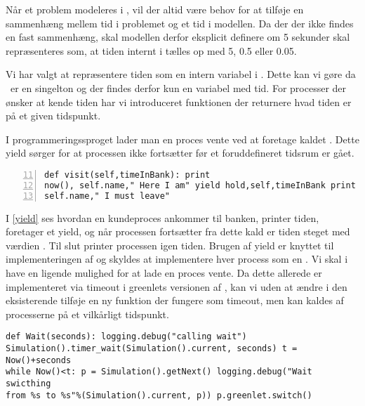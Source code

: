 Når et problem modeleres i \des, vil der altid være behov for at
tilføje en sammenhæng mellem tid i problemet og et tid i modellen. Da
der der ikke findes en fast sammenhæng, skal modellen derfor eksplicit
definere om 5 sekunder skal repræsenteres som, at tiden internt i
\pycsp tælles op med 5, 0.5 eller 0.05.

Vi har valgt at repræsentere tiden som en intern variabel i \sched.
Dette kan vi gøre da \sched ~er en singelton og der findes derfor kun
en variabel med tid. For processer der ønsker at kende tiden har vi
introduceret funktionen  der returnere hvad tiden er på et
given tidspunkt.




I programmeringssproget \simpy lader man en proces vente ved at
foretage kaldet . Dette yield sørger for at processen ikke
fortsætter før et foruddefineret tidsrum er gået.

\begin{lstlisting}[firstnumber=11 , stepnumber=2, numbers=left,
float=hbtp, label=yield, caption= Et yield i \simpy (Taget fra
Bank05.py i eksemplet fra \simpy)] def visit(self,timeInBank): print
now(), self.name," Here I am" yield hold,self,timeInBank print now(),
self.name," I must leave" \end{lstlisting}

I \cref{yield} ses hvordan en kundeproces ankommer til banken,
printer tiden, foretager et yield, og når processen fortsætter
fra dette kald er tiden steget med værdien .
Til slut printer processen igen tiden. Brugen af yield er knyttet
til implementeringen af \simpy og skyldes at \simpy implementere
hver process som en . Vi skal i \pycsp have en
ligende mulighed for at lade en proces vente. Da dette allerede er
implementeret via timeout i greenlets versionen af \pycsp, kan vi
uden at ændre i den eksisterende \sched tilføje en ny funktion
 der fungere som timeout, men kan kaldes af processerne
på et vilkårligt tidspunkt. 
\begin{lstlisting}[firstnumber=20,float=hbtp, label=wait, caption=Wait i
simuleringsversionen.] def Wait(seconds): logging.debug("calling wait")
Simulation().timer_wait(Simulation().current, seconds) t = Now()+seconds
while Now()<t: p = Simulation().getNext() logging.debug("Wait swicthing
from %s to %s"%(Simulation().current, p)) p.greenlet.switch()
\end{lstlisting}

